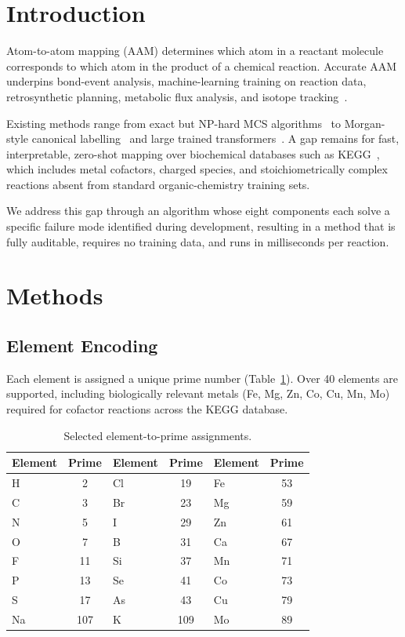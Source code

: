 \documentclass[12pt,a4paper]{article}
\begin{document}
\tableofcontents
\newpage

\section{Introduction}

Atom-to-atom mapping (AAM) determines which atom in a reactant molecule
corresponds to which atom in the product of a chemical reaction. Accurate
AAM underpins bond-event analysis, machine-learning training on reaction
data, retrosynthetic planning, metabolic flux analysis, and isotope
tracking~\cite{schneider2015, chen2009}.

Existing methods range from exact but NP-hard MCS
algorithms~\cite{raymond2002} to Morgan-style canonical
labelling~\cite{morgan1965} and large trained
transformers~\cite{schwaller2021, lin2022}. A gap remains for fast,
interpretable, zero-shot mapping over biochemical databases such as
KEGG~\cite{kanehisa2000}, which includes metal cofactors, charged
species, and stoichiometrically complex reactions absent from
standard organic-chemistry training sets.

We address this gap through an algorithm whose eight components each
solve a specific failure mode identified during development, resulting
in a method that is fully auditable, requires no training data, and
runs in milliseconds per reaction.

\section{Methods}

\subsection{Element Encoding}

Each element is assigned a unique prime number (Table~\ref{tab:primes}).
Over 40 elements are supported, including biologically relevant metals
(Fe, Mg, Zn, Co, Cu, Mn, Mo) required for cofactor reactions across
the KEGG database.

\begin{table}[h]
\centering
\caption{Selected element-to-prime assignments.}
\label{tab:primes}
\begin{tabular}{lclclc}
\toprule
Element & Prime & Element & Prime & Element & Prime \\
\midrule
H  & 2   & Cl & 19  & Fe & 53  \\
C  & 3   & Br & 23  & Mg & 59  \\
N  & 5   & I  & 29  & Zn & 61  \\
O  & 7   & B  & 31  & Ca & 67  \\
F  & 11  & Si & 37  & Mn & 71  \\
P  & 13  & Se & 41  & Co & 73  \\
S  & 17  & As & 43  & Cu & 79  \\
Na & 107 & K  & 109 & Mo & 89  \\
\bottomrule
\end{tabular}
\end{table}
\end{document}
